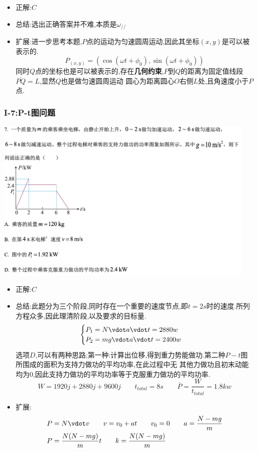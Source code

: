 \documentclass{article}
\begin{document}
\begin{itemize}
    \item 正解:\quad $C$
    \item 总结:\quad 选出正确答案并不难,本质是$\omega_{//}$
    \item 扩展:\quad 进一步思考本题,$P$点的运动为匀速圆周运动,因此其坐标$(x,y)$是可以被表示的.
          $$
              P_(x,y) = (\cos{(\omega t + \phi_{0})} , \sin{(\omega t + \phi_{0})})
          $$
          同时$Q$点的坐标也是可以被表示的,存在\textbf{几何约束},$P$到$Q$的距离为固定值线段$\overline{PQ} = L$,显然$Q$也是做匀速圆周运动
          圆心为距离圆心$O$右侧$L$处,且角速度小于$P$点.
\end{itemize}

\vspace{2em}

\subsubsection{I-7:P-t图问题}
\includegraphics[width=0.95\textwidth,keepaspectratio]{./pictures/1.2-2.png}

\begin{itemize}
    \item 正解:\quad $C$
    \item 总结:\quad 此题分为三个阶段,同时存在一个重要的速度节点,即$t = 2s$时的速度.所列方程众多,因此理清阶段,以及要求的目标量.
          $$
              \begin{cases}
                  P_{1} = N \vdot a \vdot t = 2880 w \\
                  P_{2} = mg \vdot a \vdot t  = 2400 w
              \end{cases}
          $$
          选项$D$,可以有两种思路;第一种:计算出位移,得到重力势能做功.第二种$P-t$图所围成的面积为支持力做功的平均功率,在此过程中无
          其他力做功且初末动能均为0,因此支持力做功的平均功率等于克服重力做功的平均功率.
          $$ W = 1920j + 2880j + 9600 j \qquad t_{total} = 8s \qquad \overline{P} = \frac{W}{t_{total}} = 1.8kw $$

    \item 扩展:
          \begin{align}
              P & = N \vdot v \qquad v = v_{0} + a t \qquad v_{0} = 0 \qquad a = \frac{N-mg}{m} \\
              P & = \frac{N(N-mg)}{m} t \qquad  k = \frac{N(N-mg)}{m}
          \end{align}
\end{itemize}
\end{document}
